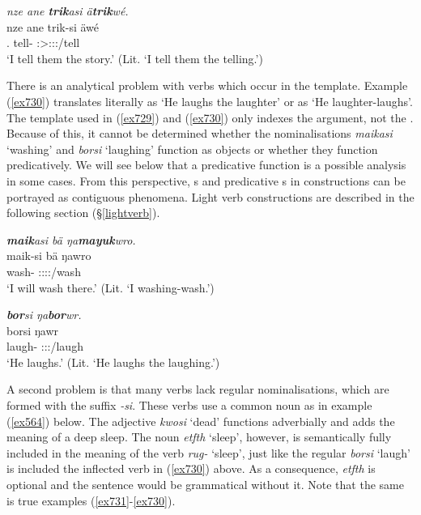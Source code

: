 \begin{exe}
	\ex \emph{nze ane \textbf{trik}asi ä\textbf{trik}wé.}\\
	\gll nze ane trik-si äwé\\
	\Fsg.\Erg{} \Dem{} tell-\Nmlz{} \Fsg:\Sbj>\Stpl:\Io:\Nonpast:\Ipfv/tell\\
	\trans `I tell them the story.' (Lit. `I tell them the telling.')
	\label{ex731}
\end{exe}

There is an analytical problem with verbs which occur in the  template. Example (\ref{ex730}) translates literally as `He laughs the laughter' or as `He laughter-laughs'. The  template used in (\ref{ex729}) and (\ref{ex730}) only indexes the  argument, not the . Because of this, it cannot be determined whether the nominalisations \emph{maikasi} `washing' and \emph{borsi} `laughing' function as objects or whether they function predicatively. We will see below that a predicative function is a possible analysis in some cases. From this perspective, s and predicative s in  constructions can be portrayed as contiguous phenomena. Light verb constructions are described in the following section (\S{}\ref{lightverb}).

\begin{exe}
	\ex \emph{\textbf{maik}asi bä ŋa\textbf{mayuk}wro.}\\
	\gll maik-si bä ŋawro\\
	wash-\Nmlz{} \Med{} \Sg:\Sbj:\Nonpast:\Ipfv:\Andat/wash\\
	\trans `I will wash there.' (Lit. `I washing-wash.')
	\label{ex729}
\end{exe}
\begin{exe}
	\ex \emph{\textbf{bor}si ŋa\textbf{bor}wr.}\\
	\gll borsi ŋawr\\
	laugh-\Nmlz{} \Stsg:\Sbj:\Nonpast:\Ipfv/laugh\\
	\trans `He laughs.' (Lit. `He laughs the laughing.')
	\label{ex730}
\end{exe}

A second problem is that many verbs lack regular nominalisations, which are formed with the suffix \emph{-si}. These verbs use a common noun as in example (\ref{ex564}) below. The adjective \emph{kwosi} `dead' functions adverbially and adds the meaning of a deep sleep. The noun \emph{etfth} `sleep', however, is semantically fully included in the meaning of the verb \emph{rug-} `sleep', just like the regular  \emph{borsi} `laugh' is included the inflected verb in (\ref{ex730}) above. As a consequence, \emph{etfth} is optional and the sentence would be grammatical without it. Note that the same is true examples (\ref{ex731}-\ref{ex730}).

